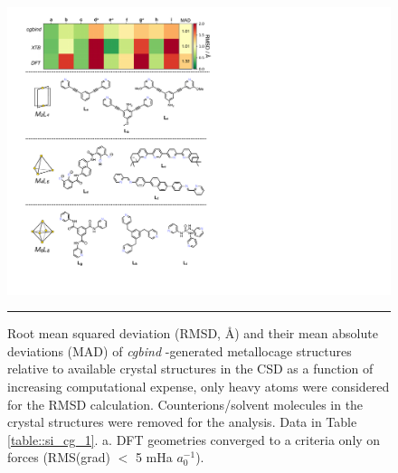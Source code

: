 \documentclass[../../main.tex]{subfiles}
\newcommand{\cgbind}{\emph{cgbind }}
\begin{document}
\begin{figure}[h!]
	\vspace{0.4cm}
	\centering
	\includegraphics[width=13.5cm]{3/cgbind/figs/fig6/fig6}
	\vspace{0.2cm}
	\hrule
	\caption{Root mean squared deviation (RMSD, \AA) and their mean absolute deviations (MAD) of \cgbind-generated metallocage structures relative to available crystal structures in the CSD as a function of increasing computational expense, only heavy atoms were considered for the RMSD calculation. Counterions/solvent molecules in the crystal structures were removed for the analysis. Data in Table \ref{table::si_cg_1}. a. DFT geometries converged to a criteria only on forces (RMS(grad) $<$ 5 mHa $a_0^{-1}$).}
	\label{fig::cg_6}
\end{figure}

\clearpage
\end{document}
